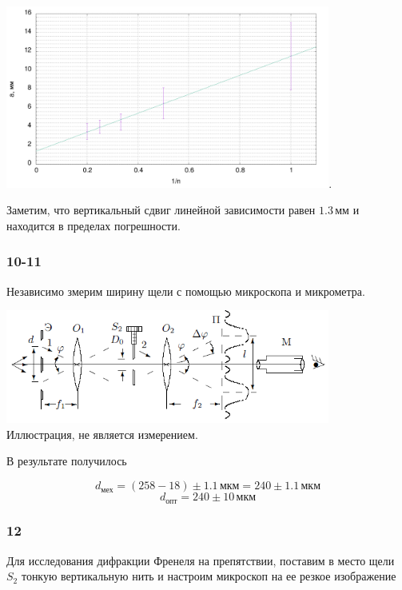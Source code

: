 \documentclass[a4paper, 12pt]{article}%
\begin{document}
\begin{center}
\includegraphics[width=0.80\textwidth]{plot1.png}.
\end{center}

Заметим, что вертикальный сдвиг линейной зависимости равен $1.3\,\text{мм}$ и находится в пределах погрешности.\\

\subsubsection*{10-11}

Независимо змерим ширину щели с помощью микроскопа и микрометра.

\begin{center}
\includegraphics[width=0.80\textwidth]{5.png}\\
Иллюстрация, не является измерением.
\end{center}

В результате получилось

\[d_{\text{мех}}=(258-18)\pm1.1\,\text{мкм}=240\pm1.1\,\text{мкм}\]
\[d_{\text{опт}}=240\pm10\,\text{мкм}\]

\subsubsection*{12}

Для исследования дифракции Френеля на препятствии, поставим в место щели $S_2$ тонкую вертикальную нить и настроим микроскоп на ее резкое изображение
\end{document}
